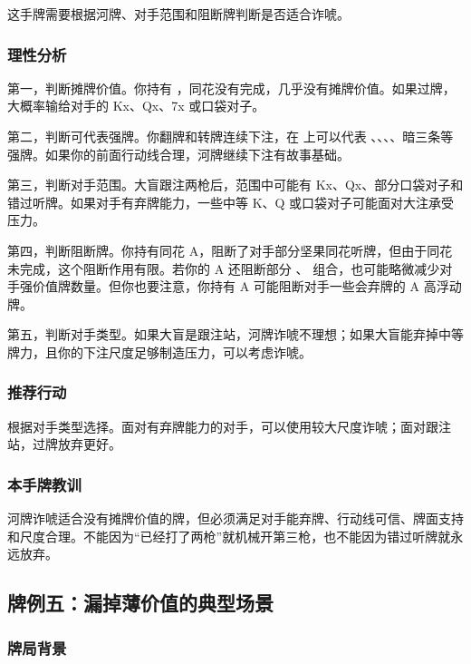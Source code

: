 这手牌需要根据河牌、对手范围和阻断牌判断是否适合诈唬。

\subsubsection*{理性分析}

第一，判断摊牌价值。你持有 ，同花没有完成，几乎没有摊牌价值。如果过牌，大概率输给对手的 Kx、Qx、7x 或口袋对子。

第二，判断可代表强牌。你翻牌和转牌连续下注，在  上可以代表 、、、、暗三条等强牌。如果你的前面行动线合理，河牌继续下注有故事基础。

第三，判断对手范围。大盲跟注两枪后，范围中可能有 Kx、Qx、部分口袋对子和错过听牌。如果对手有弃牌能力，一些中等 K、Q 或口袋对子可能面对大注承受压力。

第四，判断阻断牌。你持有同花 A，阻断了对手部分坚果同花听牌，但由于同花未完成，这个阻断作用有限。若你的 A 还阻断部分 、 组合，也可能略微减少对手强价值牌数量。但你也要注意，你持有 A 可能阻断对手一些会弃牌的 A 高浮动牌。

第五，判断对手类型。如果大盲是跟注站，河牌诈唬不理想；如果大盲能弃掉中等牌力，且你的下注尺度足够制造压力，可以考虑诈唬。

\subsubsection*{推荐行动}

根据对手类型选择。面对有弃牌能力的对手，可以使用较大尺度诈唬；面对跟注站，过牌放弃更好。

\subsubsection*{本手牌教训}

河牌诈唬适合没有摊牌价值的牌，但必须满足对手能弃牌、行动线可信、牌面支持和尺度合理。不能因为“已经打了两枪”就机械开第三枪，也不能因为错过听牌就永远放弃。

\subsection{牌例五：漏掉薄价值的典型场景}

\subsubsection*{牌局背景}

